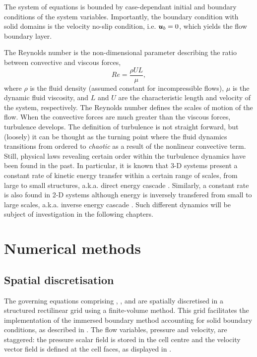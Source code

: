 \documentclass[../main.tex]{subfiles}
\begin{document}
The system of equations is bounded by case-dependant initial and boundary conditions of the system variables.
Importantly, the boundary condition with solid domains is the velocity no-slip condition, i.e. $\boldsymbol{u}_b=0$, which yields the flow boundary layer.

The Reynolds number is the non-dimensional parameter describing the ratio between convective and viscous forces,
\begin{equation}
Re=\frac{\rho U L}{\mu},
\end{equation}
where $\rho$ is the fluid density (assumed constant for incompressible flows), $\mu$ is the dynamic fluid viscosity, and $L$ and $U$ are the characteristic length and velocity of the system, respectively.
The Reynolds number defines the scales of motion of the flow.
When the convective forces are much greater than the viscous forces, turbulence develops.
The definition of turbulence is not straight forward, but (loosely) it can be thought as the turning point where the fluid dynamics transitions from ordered to \textit{chaotic} as a result of the nonlinear convective term.
Still, physical laws revealing certain order within the turbulence dynamics have been found in the past.
In particular, it is known that 3-D systems present a constant rate of kinetic energy transfer within a certain range of scales, from large to small structures, a.k.a. direct energy cascade \citep{Richardson1922,Kolmogorov1941}.
Similarly, a constant rate is also found in 2-D systems although energy is inversely transfered from small to large scales, a.k.a. inverse energy cascade \citep{Kraichnan1967,Leith1968,Batchelor1969}.
Such different dynamics will be subject of investigation in the following chapters.

\section{Numerical methods}
\label{sec:lotus}

\subsection{Spatial discretisation}

The governing equations comprising , , and  are spatially discretised in a structured rectilinear grid using a finite-volume method.
This grid facilitates the implementation of the immersed boundary method accounting for solid boundary conditions, as described in .
The flow variables, pressure and velocity, are staggered: the pressure scalar field is stored in the cell centre and the velocity vector field is defined at the cell faces, as displayed in .
\end{document}
